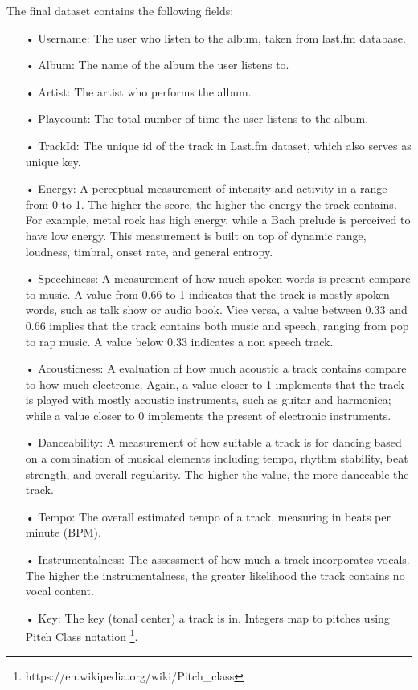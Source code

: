 \noindent The final dataset contains the following fields:

\begin{itemize}
\item[•] Username: The user who listen to the album, taken from last.fm database.
\item[•] Album: The name of the album the user listens to.
\item[•] Artist: The artist who performs the album.
\item[•] Playcount: The total number of time the user listens to the album.
\item[•] TrackId: The unique id of the track in Last.fm dataset, which also serves as unique key.
\item[•] Energy: A perceptual measurement of intensity and activity in a range from 0 to 1. The higher the score, the higher the energy the track contains. For example, metal rock has high energy, while a Bach prelude is perceived to have low energy. This measurement is built on top of dynamic range, loudness, timbral, onset rate, and general entropy.
\item[•] Speechiness: A measurement of how much spoken words is present compare to music. A value from 0.66 to 1 indicates that the track is mostly spoken words, such as talk show or audio book. Vice versa, a value between 0.33 and 0.66 implies that the track contains both music and speech, ranging from pop to rap music. A value below 0.33 indicates a non speech track. 
\item[•] Acousticness: A evaluation of how much acoustic a track contains compare to how much electronic. Again, a value closer to 1 implements that the track is played with mostly acoustic instruments, such as guitar and harmonica; while a value closer to 0 implements the present of electronic instruments.
\item[•] Danceability: A measurement of how suitable a track is for dancing based on a combination of musical elements including tempo, rhythm stability,  beat strength, and overall regularity. The higher the value, the more danceable the track.
\item[•] Tempo: The overall estimated tempo of a track, measuring in beats per minute (BPM).
\item[•] Instrumentalness: The assessment of how much a track incorporates vocals. The higher the instrumentalness, the greater likelihood the track contains no vocal content. 
\item[•] Key: The key (tonal center) a track is in. Integers map to pitches using Pitch Class notation \footnote{https://en.wikipedia.org/wiki/Pitch\_class}. 

\end{itemize}
